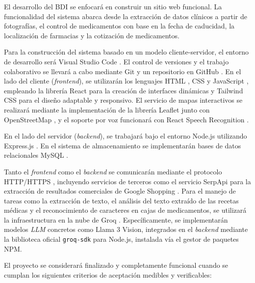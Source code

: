 El desarrollo del BDI se enfocará en construir un sitio web funcional. La funcionalidad del sistema abarca desde la extracción de datos clínicos a partir de fotografías, el control de medicamentos con base en la fecha de caducidad, la localización de farmacias y la cotización de medicamentos.

Para la construcción del sistema basado en un modelo cliente-servidor, el entorno de desarrollo será Visual Studio Code \cite{vscode}. El control de versiones y el trabajo colaborativo se llevará a cabo mediante Git y un repositorio en GitHub \cite{github}. En el lado del cliente (\emph{frontend}), se utilizarán los lenguajes HTML \cite{html}, CSS \cite{css} y JavaScript \cite{javascript}, empleando la librería React \cite{react} para la creación de interfaces dinámicas y Tailwind CSS \cite{tailwindcss} para el diseño adaptable y responsivo. El servicio de mapas interactivos se realizará mediante la implementación de la librería Leaflet \cite{leaflet} junto con OpenStreetMap \cite{openstreetmap}, y el soporte por voz funcionará con React Speech Recognition \cite{react_speech}.

En el lado del servidor (\emph{backend}), se trabajará bajo el entorno Node.js \cite{nodejs} utilizando Express.js \cite{express}. En el sistema de almacenamiento se implementarán bases de datos relacionales MySQL \cite{mysql}.

Tanto el \emph{frontend} como el \emph{backend} se comunicarán mediante el protocolo HTTP/HTTPS \cite{http}, incluyendo servicios de terceros como el servicio SerpApi \cite{CostoSerpApi} para la extracción de resultados comerciales de Google Shopping \cite{google_shopping}. Para el manejo de tareas como la extracción de texto, el análisis del texto extraído de las recetas médicas y el reconocimiento de caracteres en cajas de medicamentos, se utilizará la infraestructura en la nube de Groq \cite{CostoGroq}. Específicamente, se implementarán modelos \emph{LLM} concretos como Llama 3 Vision, integrados en el \emph{backend} mediante la biblioteca oficial \texttt{groq-sdk} para Node.js, instalada vía el gestor de paquetes NPM.

El proyecto se considerará finalizado y completamente funcional cuando se cumplan los siguientes criterios de aceptación medibles y verificables:

